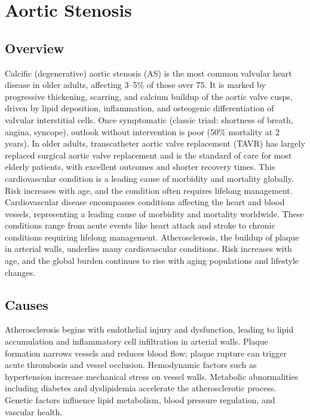 \chapter{Aortic Stenosis}
\label{sec:geriatric:Aortic Stenosis}

\section{Overview}
Calcific (degenerative) aortic stenosis (AS) is the most common valvular heart disease in older adults, affecting 3--5\% of those over 75. It is marked by progressive thickening, scarring, and calcium buildup of the aortic valve cusps, driven by lipid deposition, inflammation, and osteogenic differentiation of valvular interstitial cells. Once symptomatic (classic triad: shortness of breath, angina, syncope), outlook without intervention is poor (50\% mortality at 2 years). In older adults, transcatheter aortic valve replacement (TAVR) has largely replaced surgical aortic valve replacement and is the standard of care for most elderly patients, with excellent outcomes and shorter recovery times. This cardiovascular condition is a leading cause of morbidity and mortality globally. Risk increases with age, and the condition often requires lifelong management. Cardiovascular disease encompasses conditions affecting the heart and blood vessels, representing a leading cause of morbidity and mortality worldwide. These conditions range from acute events like heart attack and stroke to chronic conditions requiring lifelong management. Atherosclerosis, the buildup of plaque in arterial walls, underlies many cardiovascular conditions. Risk increases with age, and the global burden continues to rise with aging populations and lifestyle changes.

\section{Causes}
Atherosclerosis begins with endothelial injury and dysfunction, leading to lipid accumulation and inflammatory cell infiltration in arterial walls. Plaque formation narrows vessels and reduces blood flow; plaque rupture can trigger acute thrombosis and vessel occlusion. Hemodynamic factors such as hypertension increase mechanical stress on vessel walls. Metabolic abnormalities including diabetes and dyslipidemia accelerate the atherosclerotic process. Genetic factors influence lipid metabolism, blood pressure regulation, and vascular health.


